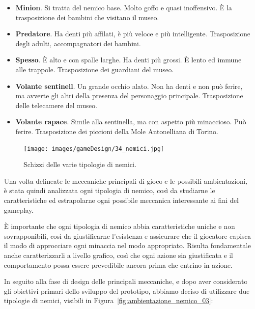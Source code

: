 \begin{itemize}
	\item \textbf{Minion}. Si tratta del nemico base. Molto goffo e quasi inoffensivo. È la trasposizione dei bambini che visitano il museo.
	\item \textbf{Predatore}. Ha denti più affilati, è più veloce e più intelligente. Trasposizione degli adulti, accompagnatori dei bambini.
	\item \textbf{Spesso}. È alto e con spalle larghe. Ha denti più grossi. È lento ed immune alle trappole. Trasposizione dei guardiani del museo.
	\item \textbf{Volante sentinell}. Un grande occhio alato. Non ha denti e non può ferire, ma avverte gli altri della presenza del personaggio principale. Trasposizione delle telecamere del museo.
	\item \textbf{Volante rapace}. Simile alla sentinella, ma con aspetto più minaccioso. Può ferire. Trasposizione dei piccioni della Mole Antonelliana di Torino.
\end{itemize}

\begin{figure}%
	\centering
	\texttt{[image: images/gameDesign/34\_nemici.jpg]}
	\caption{Schizzi delle varie tipologie di nemici.}
	\label{fig:ambientazione_nemico_02}
\end{figure}

Una volta delineate le meccaniche principali di gioco e le possibili ambientazioni, è stata quindi analizzata ogni tipologia di nemico, così da studiarne le caratteristiche ed estrapolarne ogni possibile meccanica interessante ai fini del gameplay.

È importante che ogni tipologia di nemico abbia caratteristiche uniche e non sovrapponibili, così da giustificarne l’esistenza e assicurare che il giocatore capisca il modo di approcciare ogni minaccia nel modo appropriato. Risulta fondamentale anche caratterizzarli a livello grafico, così che ogni azione sia giustificata e il comportamento possa essere prevedibile ancora prima che entrino in azione.

In seguito alla fase di design delle principali meccaniche, e dopo aver considerato gli obiettivi primari dello sviluppo del prototipo, abbiamo deciso di utilizzare due tipologie di nemici, visibili in Figura~\ref{fig:ambientazione_nemico_03}:

